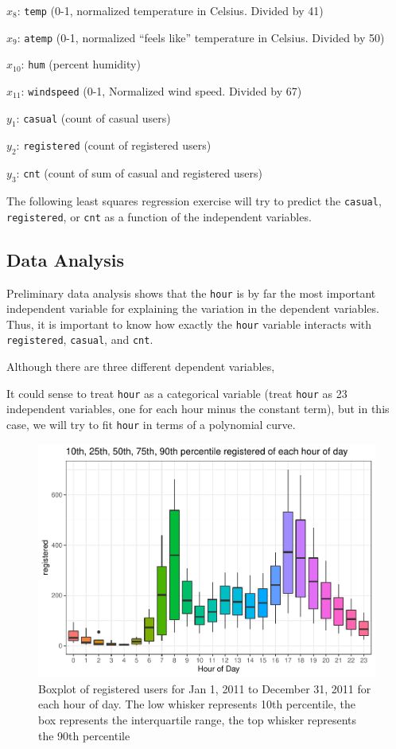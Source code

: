 \documentclass[
]{article}
\begin{document}
\(x_{8}\): \texttt{temp} (0-1, normalized temperature in Celsius.
Divided by 41)

\(x_{9}\): \texttt{atemp} (0-1, normalized ``feels like'' temperature in
Celsius. Divided by 50)

\(x_{10}\): \texttt{hum} (percent humidity)

\(x_{11}\): \texttt{windspeed} (0-1, Normalized wind speed. Divided by
67)

\(y_{1}\): \texttt{casual} (count of casual users)

\(y_{2}\): \texttt{registered} (count of registered users)

\(y_{3}\): \texttt{cnt} (count of sum of casual and registered users)

The following least squares regression exercise will try to predict the
\texttt{casual}, \texttt{registered}, or \texttt{cnt} as a function of
the independent variables.

\hypertarget{data-analysis}{%
\subsection{Data Analysis}\label{data-analysis}}

Preliminary data analysis shows that the \texttt{hour} is by far the
most important independent variable for explaining the variation in the
dependent variables. Thus, it is important to know how exactly the
\texttt{hour} variable interacts with \texttt{registered},
\texttt{casual}, and \texttt{cnt}.

Although there are three different dependent variables,

It could sense to treat \texttt{hour} as a categorical variable (treat
\texttt{hour} as 23 independent variables, one for each hour minus the
constant term), but in this case, we will try to fit \texttt{hour} in
terms of a polynomial curve.

\begin{figure}
\centering
\includegraphics{LeastSquares_files/figure-latex/unnamed-chunk-1-1.pdf}
\caption{Boxplot of registered users for Jan 1, 2011 to December 31,
2011 for each hour of day. The low whisker represents 10th percentile,
the box represents the interquartile range, the top whisker represents
the 90th percentile}
\end{figure}
\end{document}

